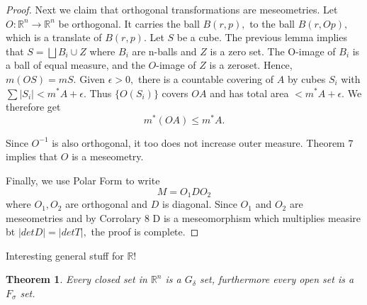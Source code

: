 \documentclass[letter]{article}
\newtheorem{theorem}{Theorem}
\newenvironment{menumerate}{%
  \edef\backupindent{\the\parindent}%
  \enumerate%
  \setlength{\parindent}{\backupindent}%
}{\endenumerate}
\begin{document}
\begin{menumerate}
\begin{proof}
		Next we claim that orthogonal transformations are meseometries. Let $O:\mathbb{R}^n \to \mathbb{R}^n$ be orthogonal. It carries the ball $B(r,p),$ to the ball $B(r, Op),$ which is a translate of $B(r,p).$ Let $S$ be a cube. The previous lemma implies that $S = \bigsqcup B_i \cup Z$ where $B_i$ are n-balls and $Z$ is a zero set. The O-image of $B_i$ is
		a ball of equal measure, and the $O$-image of $Z$ is a zeroset. Hence,
		$m(OS) = mS.$ Given $\epsilon > 0,$ there is a countable covering of $A$ by cubes $S_i$ with $\sum |S_i| < m^*A + \epsilon$. Thus $\{O(S_i)\}$ covers $OA$ and has total area $< m^*A + \epsilon.$ We therefore get
		\begin{equation}
		  	m^*(OA) \leq m^*A.
		  \end{equation}  

		Since $O^{-1}$ is also orthogonal, it too does not increase outer measure. Theorem $7$ implies that $O$ is a meseometry.

		Finally, we use Polar Form to write
		\begin{equation}
			M = O_1 D O_2
		\end{equation}
		where $O_1, O_2$ are orthogonal and $D$ is diagonal. Since $O_1$ and $O_2$ are meseometries and by Corrolary $8$ D is a meseomorphism which multiplies measire bt $|det D| =|det T|,$ the proof is complete. 
	\end{proof}
	\item Interesting general stuff for $\mathbb{R}!$
	\begin{theorem}
		Every closed set in $\mathbb{R}^n$ is a $G_\delta$ set, furthermore
		every open set is a $F_\sigma$ set.
	\end{theorem}
\end{menumerate} 
\end{document}
